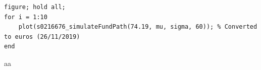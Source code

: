 \begin{lstlisting}
figure; hold all;
for i = 1:10
    plot(s0216676_simulateFundPath(74.19, mu, sigma, 60)); % Converted to euros (26/11/2019)
end
\end{lstlisting}



aa

\begin{lstlisting}

\end{lstlisting}




